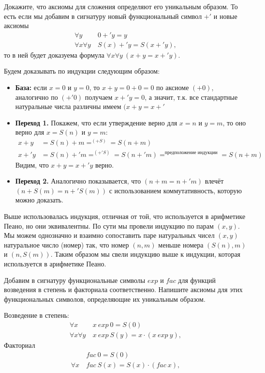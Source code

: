 \begin{task}[2]
Докажите, что аксиомы для сложения определяют его уникальным образом.
    То есть если мы добавим в сигнатуру новый функциональный символ $+'$ и новые аксиомы
\begin{align*}
\forall y\ & 0 +' y = y \tag{$+'0$} \\
\forall x \forall y\ & S(x) +' y = S(x +' y) \tag{$+'S$},
\end{align*}
то в ней будет доказуема формула $\forall x \forall y\ (x + y = x +' y)$.
\end{task}
\begin{solution}
Будем доказывать по индукции следующим образом: 
\begin{itemize}
	\item \textbf{База:} если $x = 0$ и $y = 0$, то $x + y = 0 + 0 = 0$ по аксиоме $(+0)$, аналогично по $(+'0)$ получаем $x +' y = 0$, а значит, т.к. все стандартные натуральные числа различны имеем $(x + y = x +'$
	\item \textbf{Переход 1.} Покажем, что если утверждение верно для $x = n$ и $y = m$, то оно верно для $x = S(n)$ и $y = m$:
	\begin{align*}
		x + y &= S(n) + m =^{(+S)} = S(n + m)\\
		x +' y &= S(n) +' m =^{(+'S)} = S(n +' m) =^{\text{предположение индукции}} = S(n + m)
	\end{align*}
	Видим, что $x + y = x +' y$ верно.
	\item \textbf{Переход 2.} Аналогично показывается, что $(n + m = n +' m)$ влечёт $(n + S(m) = n +' S(m))$ с использованием коммутативность, которую можно доказать.
\end{itemize}
Выше использовалась индукция, отличная от той, что используется в арифметике Пеано, но они эквивалентны. По сути мы провели индукцию по парам $(x, y)$. Мы можем однозначно и взаимно сопоставить паре натуральных чисел $(x, y)$ натуральное число (номер) так, что номер $(n, m)$ меньше номера $(S(n), m)$ и $(n, S(m))$. Таким образом мы свели индукцию выше к индукции, которая используется в арифметике Пеано. \xqed
\end{solution}

\begin{task}[3]
Добавим в сигнатуру функциональные символы $exp$ и $fac$ для функций возведения в степень и факториала соответственно.
    Напишите аксиомы для этих функциональных символов, определяющие их уникальным образом.
\end{task}
\begin{solution}
Возведение в степень:
\begin{align*}
\forall x\ & x\ exp\ 0 = S(0) \tag{$exp0$} \\
\forall x \forall y\ & x\ exp\ S(y) = x \cdot (x\ exp\ y) \tag{$expS$},
\end{align*}
Факториал
\begin{align*}
& fac\ 0 = S(0) \tag{$fac0$} \\
\forall x\ & fac\ S(x) = S(x) \cdot (fac\ x) \tag{$facS$},
\end{align*}
\end{solution}

